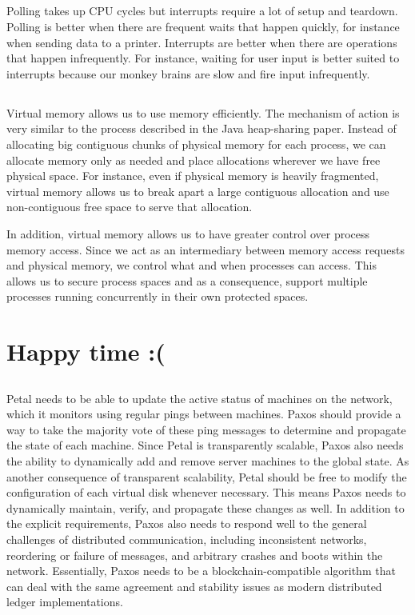 \documentclass{article}
\begin{document}
\subsection{}
Polling takes up CPU cycles but interrupts require a lot of setup and teardown. Polling is better when there are frequent waits that happen quickly, for instance when sending data to a printer. Interrupts are better when there are operations that happen infrequently. For instance, waiting for user input is better suited to interrupts because our monkey brains are slow and fire input infrequently.

\subsection{}
Virtual memory allows us to use memory efficiently. The mechanism of action is very similar to the process described in the Java heap-sharing paper. Instead of allocating big contiguous chunks of physical memory for each process, we can allocate memory only as needed and place allocations wherever we have free physical space. For instance, even if physical memory is heavily fragmented, virtual memory allows us to break apart a large contiguous allocation and use non-contiguous free space to serve that allocation.

In addition, virtual memory allows us to have greater control over process memory access. Since we act as an intermediary between memory access requests and physical memory, we control what and when processes can access. This allows us to secure process spaces and as a consequence, support multiple processes running concurrently in their own protected spaces.

\section{Happy time :(}
\setcounter{subsection}{-1}
\subsection{}
Petal needs to be able to update the active status of machines on the network, which it monitors using regular pings between machines. Paxos should provide a way to take the majority vote of these ping messages to determine and propagate the  state of each machine. Since Petal is transparently scalable, Paxos also needs the ability to dynamically add and remove server machines to the global state. As another consequence of transparent scalability, Petal should be free to modify the configuration of each virtual disk whenever necessary. This means Paxos needs to dynamically maintain, verify, and propagate these changes as well. In addition to the explicit requirements, Paxos also needs to respond well to the general challenges of distributed communication, including inconsistent networks, reordering or failure of messages, and arbitrary crashes and boots within the network. Essentially, Paxos needs to be a blockchain-compatible algorithm that can deal with the same agreement and stability issues as modern distributed ledger implementations.
\end{document}
